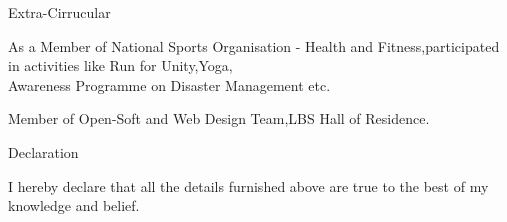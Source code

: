 \documentclass{resume} %
\begin{document}
\begin{rSection}{Extra-Cirrucular} \itemsep -2pt   


\item As a Member of National Sports Organisation - Health and Fitness,participated in activities like Run for Unity,Yoga,\\Awareness Programme on Disaster Management etc.

\item Member of Open-Soft and Web Design Team,LBS Hall of Residence.

\end{rSection} 


\begin{rSection}{ Declaration  } \itemsep -3pt        

\item I hereby declare that all the details furnished above are true to the best of my knowledge and belief.   
  
\end{rSection}
\end{document}
